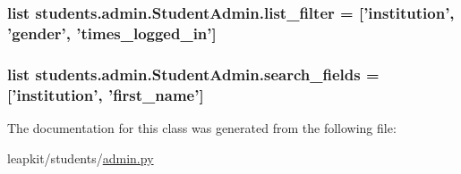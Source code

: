 \hypertarget{classstudents_1_1admin_1_1_student_admin_aa123d7d55ffee26570bf64f62f597a14}{
\subsubsection[{list\-\_\-filter}]{\setlength{\rightskip}{0pt plus 5cm}list students.\-admin.\-Student\-Admin.\-list\-\_\-filter = \mbox{[}'institution', 'gender', 'times\-\_\-logged\-\_\-in'\mbox{]}\hspace{0.3cm}{\ttfamily [static]}}}\label{classstudents_1_1admin_1_1_student_admin_aa123d7d55ffee26570bf64f62f597a14}
\hypertarget{classstudents_1_1admin_1_1_student_admin_a663d7aee6e08010d1280119d480401a8}{
\subsubsection[{search\-\_\-fields}]{\setlength{\rightskip}{0pt plus 5cm}list students.\-admin.\-Student\-Admin.\-search\-\_\-fields = \mbox{[}'institution', 'first\-\_\-name'\mbox{]}\hspace{0.3cm}{\ttfamily [static]}}}\label{classstudents_1_1admin_1_1_student_admin_a663d7aee6e08010d1280119d480401a8}


The documentation for this class was generated from the following file\-:\begin{DoxyCompactItemize}
\item 
leapkit/students/\hyperlink{admin_8py}{admin.\-py}\end{DoxyCompactItemize}
